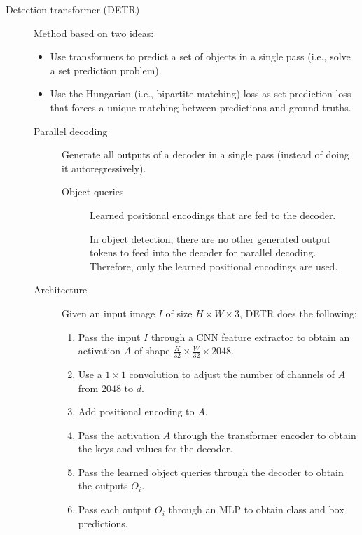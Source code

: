 \begin{description}
    \item[Detection transformer (DETR)] 
        Method based on two ideas:
        \begin{itemize}
            \item Use transformers to predict a set of objects in a single pass (i.e., solve a set prediction problem).
            \item Use the Hungarian (i.e., bipartite matching) loss as set prediction loss that forces a unique matching between predictions and ground-truths.
        \end{itemize}

        \begin{description}
            \item[Parallel decoding] 
                Generate all outputs of a decoder in a single pass (instead of doing it autoregressively).

                \begin{description}
                    \item[Object queries] 
                        Learned positional encodings that are fed to the decoder.

                        \begin{remark}
                            In object detection, there are no other generated output tokens to feed into the decoder for parallel decoding. Therefore, only the learned positional encodings are used.
                        \end{remark}
                \end{description}

            \item[Architecture]
                Given an input image $I$ of size $H \times W \times 3$, DETR does the following:
                \begin{enumerate}
                    \item Pass the input $I$ through a CNN feature extractor to obtain an activation $A$ of shape $\frac{H}{32} \times \frac{W}{32} \times 2048$.
                    \item Use a $1 \times 1$ convolution to adjust the number of channels of $A$ from $2048$ to $d$.
                    \item Add positional encoding to $A$.
                    \item Pass the activation $A$ through the transformer encoder to obtain the keys and values for the decoder.
                    \item Pass the learned object queries through the decoder to obtain the outputs $O_i$.
                    \item Pass each output $O_i$ through an MLP to obtain class and box predictions.
                \end{enumerate}


\end{description}
\end{description}
